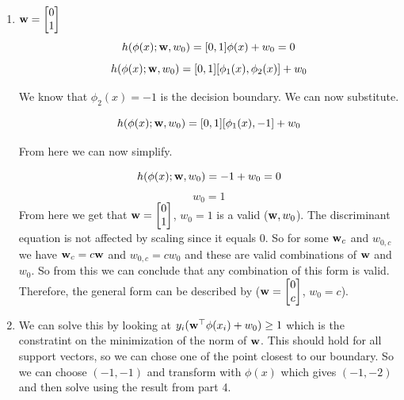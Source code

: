 \documentclass[submit]{harvardml}
\begin{document}
\begin{enumerate}
    \item
        $\mathbf{w} = \begin{bmatrix}
           0 \\
           1 \\
         \end{bmatrix}$
         \begin{equation*}
             h(\phi(x); \mathbf{w}, w_0) = [0,1]\phi(x) + w_0 = 0
         \end{equation*}
         \begin{equation*}
             h(\phi(x); \mathbf{w}, w_0) = [0,1][\phi_{1}(x), \phi_{2}(x)] + w_0
         \end{equation*}
         \begin{center}
             We know that $\phi_{2}(x) = -1$  is the decision boundary. We can now substitute.
         \end{center}
         \begin{equation*}
             h(\phi(x); \mathbf{w}, w_0) = [0,1][\phi_{1}(x), -1] + w_0
         \end{equation*}
         \begin{center}
             From here we can now simplify.
         \end{center}
         \begin{equation*}
             h(\phi(x); \mathbf{w}, w_0) = -1 + w_0 = 0
         \end{equation*}
         \begin{equation*}
             w_0 = 1
         \end{equation*}
         From here we get that $\mathbf{w} = \begin{bmatrix}
           0 \\
           1 \\
         \end{bmatrix}$, $w_0 = 1$ is a valid ($\mathbf{w}, w_0$). The discriminant equation is not affected by scaling since it equals 0. So for some $\mathbf{w}_{c}$ and $w_{0,c}$ we have $\mathbf{w}_{c} = c\mathbf{w}$ and $w_{0,c} = cw_0$ and these are valid combinations of $\mathbf{w}$ and $w_0$. So from this we can conclude that any combination of this form is valid. Therefore, the general form can be described by ($\mathbf{w} =
         \begin{bmatrix}
           0 \\
           c \\
         \end{bmatrix}$, $w_0 = c$).
         
    \item
        We can solve this by looking at $y_i(\mathbf{w}^\top \mathbf{\phi}(x_i) + w_0) \geq 1$ which is the constratint on the minimization of the norm of $\mathbf{w}$. This should hold for all support vectors, so we can chose one of the point closest to our boundary. So we can choose $(-1, -1)$ and transform with $\phi(x)$ which gives $(-1, -2)$ and then solve using the result from part 4.
        

\end{enumerate}
\end{document}
